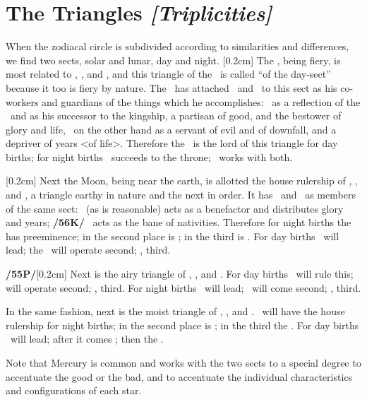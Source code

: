 \section{The Triangles \textit{[Triplicities]}}

When the zodiacal circle is subdivided according to similarities and differences, we find two sects, solar and lunar, day and night. 
[0.2cm]
The \Sun, being fiery, is most related to \Aries, \Leo, and \Sagittarius, and this triangle of the \Sun\, is called “of the day-sect” because it too is fiery by nature. The \Sun\, has attached \Jupiter\, and \Saturn\, to this sect as his co-workers and guardians of the things which he accomplishes: \Jupiter\, as a reflection of the \Sun\, and as his successor to the kingship, a partisan of good, and the bestower of glory
and life, \Saturn\, on the other hand as a servant of evil and of downfall, and a depriver of years <of life>. Therefore the \Sun\, is the lord of this triangle for day births; for night births \Jupiter\, succeeds to the throne; \Saturn\, works with both.

[0.2cm]
Next the Moon, being near the earth, is allotted the house rulership of \Taurus, \Virgo, and \Capricorn, a triangle earthy in nature and the next in order. It has \Venus\, and \Mars\, as members of the same sect: \Venus\,
(as is reasonable) acts as a benefactor and distributes glory and years; \textbf{/56K/} \Mars\, acts as the bane of
nativities. Therefore for night births the \Moon\, has preeminence; in the second place is \Venus; in the third
is \Mars. For day births \Venus\, will lead; the \Moon\, will operate second; \Mars, third.

\textbf{/55P/}[0.2cm] Next is the airy triangle of \Gemini, \Libra, and \Aquarius. For day births \Saturn\, will rule this;
\Mercury\, will operate second; \Jupiter, third. For night births \Mercury\, will lead; \Saturn\, will come second; \Jupiter, third.

In the same fashion, next is the moist triangle of \Cancer, \Scorpio, and \Pisces. \Mars\, will have the house rulership for night births; in the second place is \Venus; in the third the \Moon. For day births \Venus\, will lead; after it comes \Mars; then the \Moon. 

\mndl[0.2cm]
Note that Mercury is common and works with the two sects to a special degree to accentuate the good or the bad, and to accentuate the individual characteristics and configurations of each star.

\newpage